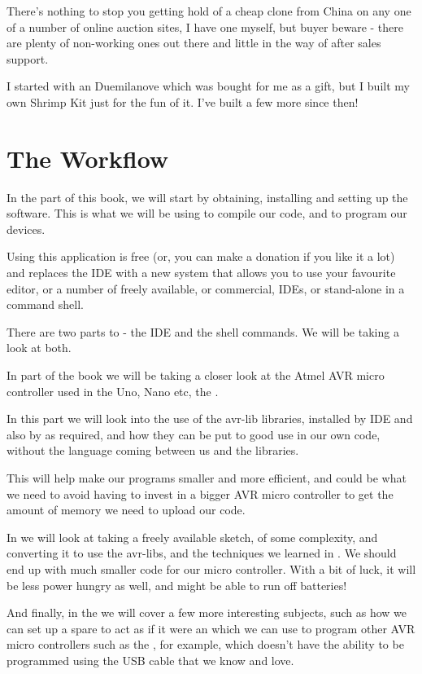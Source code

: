 There's nothing to stop you getting hold of a cheap  clone from China on any one of a number of online auction sites, I have one myself, but buyer beware - there are plenty of non-working ones out there and little in the way of after sales support.

I started with an  Duemilanove which was bought for me as a gift, but I built my own Shrimp Kit just for the fun of it. I've built a few more since then!

\section{The Workflow}\label{the-workflow}  

In the  part of this book, we will start by obtaining, installing and setting up the  software. This is what we will be using to compile our code, and to program our devices. 

Using this application is free (or, you can make a donation if you like it a lot) and replaces the  IDE with a new system that allows you to use your favourite editor, or a number of freely available, or commercial, IDEs, or stand-alone in a command shell.

There are two parts to  - the IDE and the shell commands. We will be taking a look at both.

In  part of the book we will be taking a closer look at the Atmel AVR micro controller used in the Uno, Nano etc, the . 

In this part we will look into the use of the avr-lib libraries, installed by  IDE and also by  as required, and how they can be put to good use in our own code, without the  language coming between us and the libraries.

This will help make our programs smaller and more efficient, and could be what we need to avoid having to invest in a bigger AVR micro controller to get the amount of memory we need to upload our code.

In  we will look at taking a freely available  sketch, of some complexity, and converting it to use the avr-libs, and the techniques we learned in . We should end up with much smaller code for our micro controller. With a bit of luck, it will be less power hungry as well, and might be able to run off batteries!

And finally, in the  we will cover a few more interesting subjects, such as how we can set up a spare  to act as if it were an  which we can use to program other AVR micro controllers such as the , for example, which doesn't have the ability to be programmed using the USB cable that we know and love.
